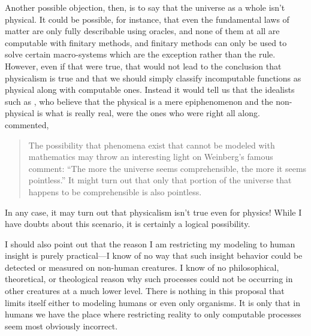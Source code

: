Another possible objection, then, is to say that the universe as a whole isn't physical.  It could be possible, for instance, that even the fundamental laws of matter are only fully describable using oracles, and none of them at all are computable with finitary methods, and finitary methods can only be used to solve certain macro-systems which are the exception rather than the rule.  However, even if that were true, that would not lead to the conclusion that physicalism is true and that we should simply classify incomputable functions as physical along with computable ones.  Instead it would tell us that the idealists such as \citet{henry2005}, who believe that the physical is a mere epiphenomenon and the non-physical is what is really real, were the ones who were right all along.  \citet{robertson1999} commented,

\begin{quote}
The possibility that phenomena exist that cannot be modeled with mathematics may throw an interesting light on Weinberg's famous comment: ``The more the universe seems comprehensible, the more it seems pointless.'' It might turn out that only that portion of the universe that happens to be comprehensible is also pointless.
\end{quote}

In any case, it may turn out that physicalism isn't true even for physics!  While I have doubts about this scenario, it is certainly a logical possibility.

I should also point out that the reason I am restricting my modeling to human insight is purely practical---I know of no way that such insight behavior could be detected or measured on non-human creatures.  I know of no philosophical, theoretical, or theological reason why such processes could not be occurring in other creatures at a much lower level.  There is nothing in this proposal that limits itself either to modeling humans or even only organisms.  It is only that in humans we have the place where restricting reality to only computable processes seem most obviously incorrect.


